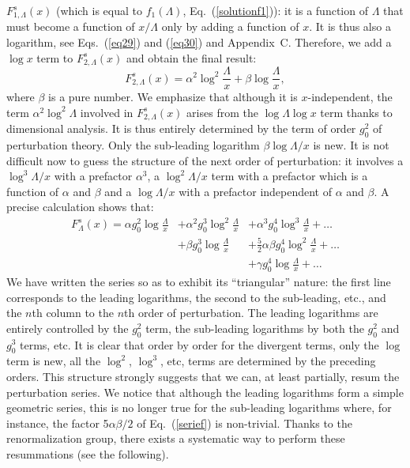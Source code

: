 \documentclass[floatfix,preprintnumbers,amsmath,amssymb,prb,12pt]{revtex4-1}
\begin{document}
$F_{1,\Lambda}^s(x)$ (which is equal to 
$f_1(\Lambda)$, Eq.~(\ref{solutionf1})): it is a function of
$\Lambda$ that must become a function of $x/\Lambda$ only by
adding a function of $x$. It is thus also a logarithm, see
Eqs.~(\ref{eq29}) and (\ref{eq30}) and Appendix~C. Therefore,
we add a $\log x$ term to
$F_{2,\Lambda}^s(x)$ and obtain the final result:
\begin{equation}
F_{2,\Lambda}^s(x)= \alpha^2 \log^2\frac{\Lambda}{x} + \beta
\log\frac{\Lambda}{x},
\label{solutionf2exemple}
\end{equation}
where $\beta$ is a pure number. We emphasize that although it is
$x$-independent, the term $\alpha^2 \log^2\Lambda$ involved in
$F_{2,\Lambda}^s(x)$ arises from the $\log\Lambda \log x$ term
thanks to dimensional analysis. It is thus entirely determined by
the term of order $g_0^2$ of perturbation theory. Only the
sub-leading logarithm $\beta \log\Lambda/x$ is new. It is not
difficult now to guess the structure of the next order of
perturbation: it involves a $\log^3{\Lambda}/{x}$ with a prefactor
$\alpha^3$, a $\log^2{\Lambda}/{x}$ term with a prefactor which
is a function of $\alpha$ and $\beta$ and a $\log{\Lambda}/{x}$
with a prefactor independent of $\alpha$ and $\beta$. A precise
calculation shows that:
\begin{equation}
\begin{array}{lll}
F_{\Lambda}^s(x)={\displaystyle\alpha g_0^2\log\frac{\Lambda}{x}} 
       &{\displaystyle+ \alpha^2 g_0^3 \log^2\frac{\Lambda}{x}} &{\displaystyle+\alpha^3g_0^4 \log^3\frac{\Lambda}{x}+\dots} \\
       &{\displaystyle+  \beta g_0^3 \log\frac{\Lambda}{x}}     &{\displaystyle+\frac{5}{2}\alpha\beta g_0^4\log^2\frac{\Lambda}{x}+\dots}\\
       &                                                        &{\displaystyle+\gamma g_0^4\log\frac{\Lambda}{x}+\dots}
\end{array}
\label{serief}
\end{equation}
We have written the series so as to exhibit its ``triangular''
nature: the first line corresponds to the leading logarithms, the
second to the sub-leading, etc., and the $n$th column to the 
$n$th order of perturbation. The leading logarithms are
entirely controlled by the $g_0^2$ term, the sub-leading
logarithms by both the
$g_0^2$ and $g_0^3$ terms, etc. It is clear that order by order
for the divergent terms, only the $\log$ term is new, all the
$\log^2$, $\log^3$, etc, terms are determined by the preceding
orders. This structure strongly suggests that we can,
at least partially, resum the perturbation series. We notice
that although the leading logarithms form a simple geometric
series, this is no longer true for the sub-leading logarithms
where, for instance, the factor 5$\alpha\beta/2$ of
Eq.~(\ref{serief}) is non-trivial. Thanks to the renormalization
group, there exists a systematic way to perform these
resummations\cite{shirkov01} (see the following).
\end{document}
